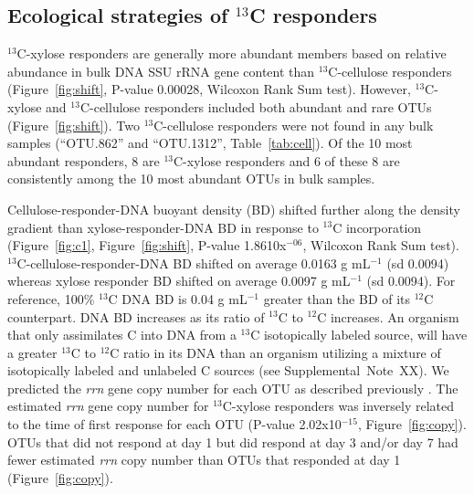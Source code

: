 \subsection{Ecological strategies of $^{13}$C responders}
$^{13}$C-xylose responders are generally more abundant members based on
relative abundance in bulk DNA SSU rRNA gene content than $^{13}$C-cellulose
responders (Figure~\ref{fig:shift}, P-value 0.00028, Wilcoxon Rank Sum test).
However, $^{13}$C-xylose and $^{13}$C-cellulose responders included both
abundant and rare OTUs (Figure~\ref{fig:shift}). Two
$^{13}$C-cellulose responders were not found in any bulk samples (``OTU.862''
and ``OTU.1312'', Table~\ref{tab:cell}). Of the
10 most abundant responders,
8 are $^{13}$C-xylose responders and 6 of these 8 are consistently among the 10
  most abundant OTUs in bulk samples.

Cellulose-responder-DNA buoyant density (BD) shifted further along the density
gradient than xylose-responder-DNA BD in response to $^{13}$C incorporation
(Figure~\ref{fig:c1}, Figure~\ref{fig:shift}, P-value 1.8610x$^{-06}$, Wilcoxon
Rank Sum test). $^{13}$C-cellulose-responder-DNA BD shifted on average
0.0163 g mL$^{-1}$ (sd 0.0094) whereas xylose responder BD shifted on average
0.0097 g mL$^{-1}$ (sd 0.0094). For reference, 100\% $^{13}$C DNA BD is 0.04
g mL$^{-1}$ greater than the BD of its $^{12}$C counterpart. DNA BD increases
as its ratio of $^{13}$C to $^{12}$C increases. An organism that only
assimilates C into DNA from a $^{13}$C isotopically labeled source, will have
a greater $^{13}$C to $^{12}$C ratio in its DNA than an organism utilizing
a mixture of isotopically labeled and unlabeled C sources (see
Supplemental~Note~XX). We predicted the \textit{rrn} gene copy number for each
OTU as described previously \citep{Kembel_2012}. The estimated
\textit{rrn} gene copy number for $^{13}$C-xylose responders was inversely
related to the time of first response for each OTU (P-value
2.02x10$^{-15}$, Figure~\ref{fig:copy}). OTUs that did not respond at day
1 but did respond at day 3 and/or day 7 had fewer estimated
\textit{rrn} copy number than OTUs that responded at day 1
(Figure~\ref{fig:copy}). 

